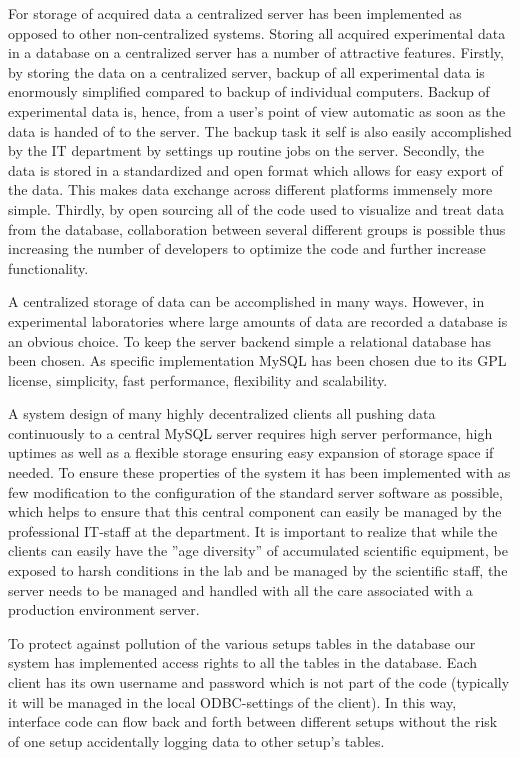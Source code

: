 For storage of acquired data a centralized server has been implemented as
opposed to other non-centralized systems\cite{McIntosh2003}. Storing all
acquired experimental data in a database on a centralized server has a number
of attractive features. Firstly, by storing the data on a centralized server,
backup of all experimental data is enormously simplified compared to backup of
individual computers. Backup of experimental data is, hence, from a user's
point of view automatic as soon as the data is handed of to the server. The backup task it self is also easily accomplished by the IT department by settings up routine jobs on the server.
Secondly, the data is stored in a standardized and open format which allows for
easy export of the data.
This
makes data exchange across different platforms immensely more simple. Thirdly,
by open sourcing all of the code used to visualize and treat data from the
database, collaboration between several different groups is possible thus
increasing the number of developers to optimize the code and further increase
functionality.

A centralized storage of data can be accomplished in many ways. However, in
experimental laboratories where large amounts of data are recorded a database
is an obvious choice. To keep the server backend simple a
relational database has been chosen. As specific implementation MySQL has been
chosen due to its GPL license\cite{gpl}, simplicity, fast
performance, flexibility and scalability.

A system design of many highly decentralized clients all pushing data
continuously to a central MySQL server requires high server performance, high
uptimes as well as a flexible storage ensuring easy expansion of storage space
if needed. To ensure these properties of the system it has been implemented
with as few modification to the configuration of the standard server software
as possible, which helps to ensure that this central component can easily be
managed by the professional IT-staff at the department. It is important to
realize that while the clients can easily have the ''age diversity'' of
accumulated scientific equipment, be exposed to harsh conditions in the lab and
be managed by the scientific staff, the server needs to be managed
and handled with all the care associated with a production environment server.

To protect against pollution of the various setups tables in the database our
system has implemented access rights to all the tables in the database. Each
client has its own username and password which is not part of the code
(typically it will be managed in the local ODBC-settings of the client). In
this way, interface code can flow back and forth between different setups
without the risk of one setup accidentally logging data to other setup's
tables.


